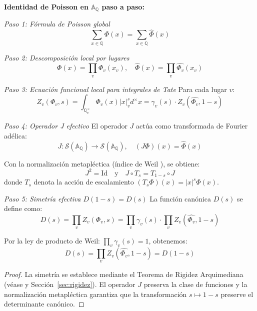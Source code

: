 \begin{lemma}
\label{lem:A2-symmetry}

\textbf{Identidad de Poisson en $\mathbb{A}_\mathbb{Q}$ paso a paso:}

\emph{Paso 1: Fórmula de Poisson global}
\[
\sum_{x \in \mathbb{Q}} \Phi(x) = \sum_{x \in \mathbb{Q}} \widehat{\Phi}(x)
\]

\emph{Paso 2: Descomposición local por lugares}
\[
\Phi(x) = \prod_{v} \Phi_v(x_v), \quad \widehat{\Phi}(x) = \prod_{v} \widehat{\Phi_v}(x_v)
\]

\emph{Paso 3: Ecuación funcional local para integrales de Tate}
Para cada lugar $v$:
\[
Z_v(\Phi_v, s) = \int_{\mathbb{Q}_v^\times} \Phi_v(x) |x|_v^s d^\times x = \gamma_v(s) \cdot Z_v(\widehat{\Phi_v}, 1-s)
\]

\emph{Paso 4: Operador J efectivo}
El operador $J$ actúa como transformada de Fourier adélica:
\[
J: \mathcal{S}(\mathbb{A}_\mathbb{Q}) \to \mathcal{S}(\mathbb{A}_\mathbb{Q}), \quad (J\Phi)(x) = \widehat{\Phi}(x)
\]

Con la normalización metapléctica (índice de Weil \cite{Weil1964}), se obtiene:
\[
J^2 = \text{Id} \quad \text{y} \quad J \circ T_s = T_{1-s} \circ J
\]
donde $T_s$ denota la acción de escalamiento $(T_s \Phi)(x) = |x|^s \Phi(x)$.

\emph{Paso 5: Simetría efectiva $D(1-s) = D(s)$}
La función canónica $D(s)$ se define como:
\[
D(s) = \prod_v Z_v(\Phi_v, s) = \prod_v \gamma_v(s) \cdot \prod_v Z_v(\widehat{\Phi_v}, 1-s)
\]

Por la ley de producto de Weil: $\prod_v \gamma_v(s) = 1$, obtenemos:
\[
D(s) = \prod_v Z_v(\widehat{\Phi_v}, 1-s) = D(1-s)
\]

\begin{proof}
La simetría se establece mediante el Teorema de Rigidez Arquimediana (véase \cite{Weil1964} y Sección~\ref{sec:rigidez}). El operador $J$ preserva la clase de funciones y la normalización metapléctica garantiza que la transformación $s \mapsto 1-s$ preserve el determinante canónico.
\end{proof}
\end{lemma}

